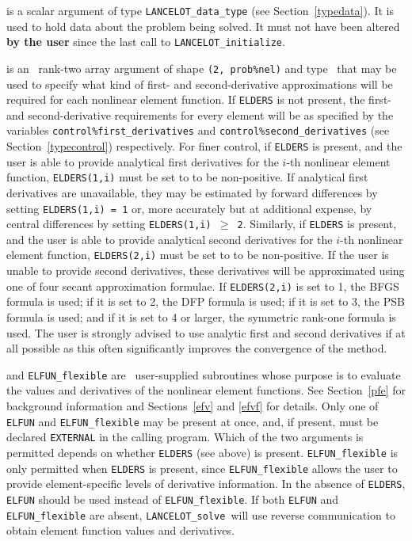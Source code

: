 \documentclass{galahad}
\newcommand{\fullpackagename}{LANC\-E\-LOT}
\newcommand{\solver}{{\tt \fullpackagename\_solve}}
\begin{document}
\begin{description}
 is a scalar \intentinout argument of type
{\tt \fullpackagename\_data\_type}
(see Section~\ref{typedata}). It is used to hold data about the problem being
solved. It must not have been altered {\bf by the user} since the last call to
{\tt \fullpackagename\_initialize}.


 is an \optional\ rank-two \intentinout array argument of
shape {\tt (2, prob\%nel)} and type \integer\,
that may be used to specify what kind of first- and second-derivative
approximations will be required for each nonlinear element function.
If {\tt ELDERS} is not present, the first- and second-derivative
requirements for every element will be as specified by
the variables {\tt control\%first\_derivatives} and
{\tt control\%second\_derivatives} (see Section~\ref{typecontrol})
respectively. For finer control,
if {\tt ELDERS} is present, and the user is able to provide
analytical first derivatives for the $i$-th nonlinear
element function, {\tt ELDERS(1,i)}
must be set to to be non-positive.
If analytical first derivatives are unavailable,
they may be estimated by forward differences by setting
{\tt ELDERS(1,i) = 1} or, more accurately but at additional expense,
by central differences by setting
{\tt ELDERS(1,i) $\geq$ 2}.
Similarly, if {\tt ELDERS} is present, and the user is able to provide
analytical second derivatives for the $i$-th nonlinear
element function, {\tt ELDERS(2,i)}
must be set to to be non-positive.
If the user is unable to provide second derivatives, these
derivatives will be approximated using one of four
secant approximation formulae. If {\tt ELDERS(2,i)} is set to
1, the BFGS formula is used; if it is set to 2, the DFP
formula is used; if it is set to 3, the PSB
formula is used; and if it is set to 4 or larger, the symmetric
rank-one formula is used. The user is strongly advised to
use analytic first and second derivatives
if at all possible as this often
significantly improves the convergence of the method.

 and {\tt ELFUN\_flexible} are \optional\
user-supplied subroutines whose purpose is to
evaluate the values and derivatives of the nonlinear element functions.
See Section~\ref{pfe} for background information and Sections~\ref{efv}
and \ref{efvf} for details.
Only one of {\tt ELFUN} and {\tt ELFUN\_flexible} may be present at once,
and, if present, must be declared {\tt EXTERNAL} in the calling program.
Which of the two arguments is permitted depends on whether {\tt ELDERS}
(see above) is present. {\tt ELFUN\_flexible} is only permitted when
{\tt ELDERS} is present, since {\tt ELFUN\_flexible} allows the user
to provide element-specific levels of derivative information. In the
absence of {\tt ELDERS},  {\tt ELFUN} should be used instead of
{\tt ELFUN\_flexible}.
If both {\tt ELFUN} and {\tt ELFUN\_flexible}
are absent, \solver\ will use reverse communication to
obtain element function values and derivatives.


\end{description}
\end{document}
